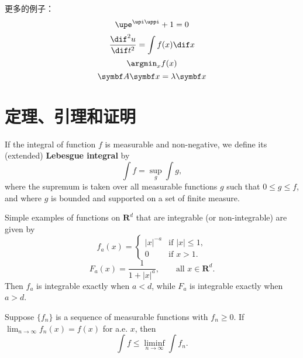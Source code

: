 更多的例子：
\begin{equation}
  \upe^{\upi\uppi} + 1 = 0
\end{equation}
\begin{equation}
  \frac{\dif^2 u}{\dif t^2} = \int f(x) \dif x
\end{equation}
\begin{equation}
  \argmin_x f(x)
\end{equation}
\begin{equation}
  \mat{A} \vec{x} = \lambda \vec{x}
\end{equation}



\section{定理、引理和证明}

\newcommand\real{\mathbf{R}}

\begin{definition}
  If the integral of function $f$ is measurable and non-negative, we define
  its (extended) \textbf{Lebesgue integral} by
  \begin{equation}
      \int f = \sup_g \int g,
  \end{equation}
  where the supremum is taken over all measurable functions $g$ such that
  $0 \le g \le f$, and where $g$ is bounded and supported on a set of
  finite measure.
\end{definition}

\begin{example}
  Simple examples of functions on $\real^d$ that are integrable
  (or non-integrable) are given by
  \begin{equation}
    f_a(x) =
    \begin{cases}
      |x|^{-a} & \text{if } |x| \le 1,\\
      0        & \text{if } x > 1.
    \end{cases}
  \end{equation}
  \begin{equation}
      F_a(x) = \frac{1}{1 + |x|^a}, \qquad \text{all } x \in \real^d.
  \end{equation}
  Then $f_a$ is integrable exactly when $a < d$, while $F_a$ is integrable
  exactly when $a > d$.
\end{example}

\begin{lemma}[Fatou]
  Suppose $\{f_n\}$ is a sequence of measurable functions with $f_n \geq 0$.
  If $\lim_{n \to \infty} f_n(x) = f(x)$ for a.e. $x$, then
  \begin{equation}
      \int f \le \liminf_{n \to \infty} \int f_n.
  \end{equation}
\end{lemma}

